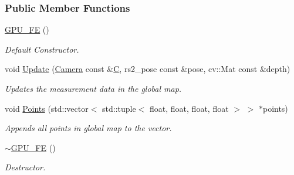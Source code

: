 \subsubsection*{Public Member Functions}
\begin{DoxyCompactItemize}
\item 
\hyperlink{classGPU__FE_a2c2e9757a562ef8c33ce9fb474ae0742}{G\+P\+U\+\_\+\+FE} ()
\begin{DoxyCompactList}\small\item\em Default Constructor. \end{DoxyCompactList}\item 
void \hyperlink{classGPU__FE_aa9039bd613961d4e0911b8514ed14fba}{Update} (\hyperlink{classCamera}{Camera} const \&\hyperlink{classGPU__FE_aada926a7b999648bcb837507bf6a75d3}{C}, rs2\+\_\+pose const \&pose, cv\+::\+Mat const \&depth)
\begin{DoxyCompactList}\small\item\em Updates the measurement data in the global map. \end{DoxyCompactList}\item 
void \hyperlink{classGPU__FE_aea86626bdab826bc91b955ad6e5f6653}{Points} (std\+::vector$<$ std\+::tuple$<$ float, float, float, float $>$ $>$ $\ast$points)
\begin{DoxyCompactList}\small\item\em Appends all points in global map to the vector. \end{DoxyCompactList}\item 
\hyperlink{classGPU__FE_a1da80fa2f9f13df184e545e46f9d9270}{$\sim$\+G\+P\+U\+\_\+\+FE} ()
\begin{DoxyCompactList}\small\item\em Destructor. \end{DoxyCompactList}\end{DoxyCompactItemize}

